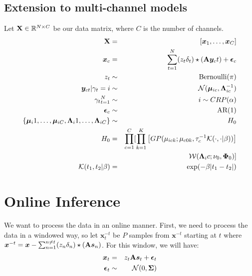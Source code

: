 \documentclass{article} %
\newcommand{\beqs}{\begin{eqnarray}}
\newcommand{\eeqs}{\end{eqnarray}}
\newcommand{\Amat}{{\bf A}}
\newcommand{\Xmat}{{\bf X}}
\newcommand{\sv}{\boldsymbol{s}}
\newcommand{\xv}{\boldsymbol{x}}
\newcommand{\yv}{\boldsymbol{y}}
\newcommand{\Lambdamat}{\boldsymbol{\Lambda}}
\newcommand{\Sigmamat}{\boldsymbol{\Sigma}}
\newcommand{\Phimat}{\boldsymbol{\Phi}}
\newcommand{\epsilonv}{\boldsymbol{\epsilon}}
\newcommand{\muv}{\boldsymbol{\mu}}
\begin{document}
\subsection{Extension to multi-channel models}
Let $\Xmat\in\mathbb{R}^{N\times C}$ be our data matrix, where $C$ is the number of channels. 
\beqs
\Xmat&=&[\xv_1,\dots,\xv_C]\\
\xv_c&=&\sum_{t=1}^{N}(z_t\delta_t)\star (\Amat\yv_ct)+\epsilonv_c\\
z_t&\sim&\text{Bernoulli}(\pi)\\
\yv_{ct}|\gamma_t=i&\sim&\mathcal{N}(\muv_{ic},\Lambdamat_{ic}^{-1})\\
{\gamma_t}_{t=1}^{N}&\sim&i\sim CRP(\alpha)\\
\epsilonv_c&\sim&\text{AR}(1)\\
\{\muv_i1,\dots,\muv_{iC},\Lambdamat_i1,\dots,\Lambdamat_{iC}\}&\sim& H_0\\
H_0&=&\prod_{c=1}^{C}[\prod_{k=1}^{K}\left[GP(\mu_{ick};\mu_{c0k},\tau_c^{-1}\mathcal{K}(\cdot,\cdot|\beta))\right]\nonumber\\
&&\mathcal{W}(\Lambdamat_ic;\nu_0,\Phimat_0)]\\
\mathcal{K}(t_1,t_2|\beta)&=&\exp(-\beta |t_1-t_2|)
\eeqs
\section{Online Inference}
We want to process the data in an online manner.  First, we need to process the data in a windowed way, so let $\xv_t^{-t}$ be $P$ samples from $\xv^{-t}$ starting at $t$ where $\xv^{-t}=\xv-\sum_{n=1}^{n\neq t}(z_n\delta_n)\star (\Amat\sv_n)$.  For this window, we will have:
\beqs
\xv_t&=&z_t\Amat\sv_t+\epsilonv_t\\
\epsilonv_t&\sim&\mathcal{N}(0,\Sigmamat)
\eeqs
\end{document}
